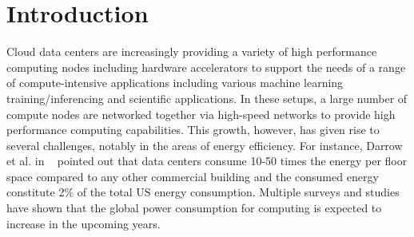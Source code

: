 \section{Introduction} \label{ch3:sec:Introduction}
Cloud data centers are increasingly providing a variety of high performance computing nodes 
including hardware accelerators to support the needs of a range of compute-intensive 
applications including various machine learning training/inferencing and scientific
applications. In these setups, a large number of compute nodes are networked together via
high-speed networks to provide high performance computing capabilities. 
This growth, however, has given rise to several challenges, notably in the areas of energy efficiency.  
For instance, Darrow et al. in ~\cite{darrow2009opportunities} pointed out that data centers consume 10-50 times the energy per floor space compared to any other commercial building and the consumed energy constitute 2\% of the total US energy consumption.
Multiple surveys and studies~\cite{darrow2009opportunities,koomey2011growth,koot2021usage,shalf2020future,dayarathna2015data} have shown that the global power consumption for computing is expected to increase in the upcoming years. 

